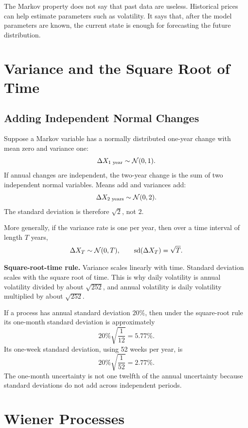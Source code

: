 The Markov property does not say that past data are useless. Historical prices
can help estimate parameters such as volatility. It says that, after the model
parameters are known, the current state is enough for forecasting the future
distribution.

\section{Variance and the Square Root of Time}

\subsection{Adding Independent Normal Changes}

Suppose a Markov variable has a normally distributed one-year change with mean
zero and variance one:
\[
    \Delta X_{\text{1 year}} \sim \mathcal{N}(0,1).
\]
If annual changes are independent, the two-year change is the sum of two
independent normal variables. Means add and variances add:
\[
    \Delta X_{\text{2 years}} \sim \mathcal{N}(0,2).
\]
The standard deviation is therefore $\sqrt{2}$, not $2$.

More generally, if the variance rate is one per year, then over a time interval
of length $T$ years,
\[
    \Delta X_T \sim \mathcal{N}(0,T),
    \qquad
    \operatorname{sd}(\Delta X_T)=\sqrt{T}.
\]

\begin{boxD}
\textbf{Square-root-time rule.} Variance scales linearly with time. Standard
deviation scales with the square root of time. This is why daily volatility is
annual volatility divided by about $\sqrt{252}$, and annual volatility is daily
volatility multiplied by about $\sqrt{252}$.
\end{boxD}

\begin{exmp}
If a process has annual standard deviation $20\%$, then under the square-root
rule its one-month standard deviation is approximately
\[
    20\%\sqrt{\frac{1}{12}} = 5.77\%.
\]
Its one-week standard deviation, using 52 weeks per year, is
\[
    20\%\sqrt{\frac{1}{52}} = 2.77\%.
\]
The one-month uncertainty is not one twelfth of the annual uncertainty because
standard deviations do not add across independent periods.
\end{exmp}

\section{Wiener Processes}

